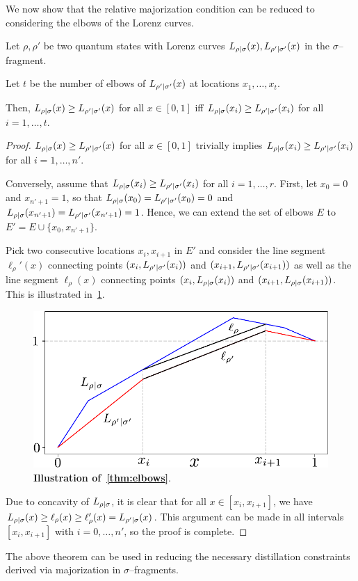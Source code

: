 \documentclass[pra,
aps,
twocolumn,
superscriptaddress,
groupedaddress,
nofootinbib,
reprint
]{revtex4-1}
\begin{document}
We now show that the relative majorization condition can be reduced to considering the elbows of the Lorenz curves.
\begin{proposition}\label{thm:elbows}
	Let $\rho, \rho'$ be two quantum states with Lorenz curves ${L_{\rho|\sigma}}(x), {L_{\rho'|\sigma'}}(x)$ in the $\sigma$--fragment.
	
	Let $t$ be the number of elbows of ${L_{\rho'|\sigma'}}(x)$ at locations $x_1, \dots, x_t$.
	
	Then, ${L_{\rho|\sigma}}(x) \geq {L_{\rho'|\sigma'}}(x)$ for all $x \in [0,1]$ iff ${L_{\rho|\sigma}}(x_{i}) \geq {L_{\rho'|\sigma'}}(x_{i})$ for all $i =1,\dots,t$.
\end{proposition}
\begin{proof}	
	${L_{\rho|\sigma}}(x) \geq {L_{\rho'|\sigma'}}(x)$ for all $x \in [0,1]$ trivially implies ${L_{\rho|\sigma}}(x_{i}) \geq {L_{\rho'|\sigma'}}(x_{i})$ for all $i = 1,\dots,n'$.
	
	Conversely, assume that ${L_{\rho|\sigma}}(x_{i}) \geq {L_{\rho'|\sigma'}}(x_{i})$ for all $i = 1,\dots,r$.
	First, let $x_0 = 0$ and $x_{n'+1} = 1$, so that ${L_{\rho|\sigma}}(x_0) = {L_{\rho'|\sigma'}}(x_0) = 0$ and ${L_{\rho|\sigma}}(x_{n'+1}) = {L_{\rho'|\sigma'}}(x_{n'+1}) = 1$.
	Hence, we can extend the set of elbows $E$ to $E' = E \cup \{x_0, x_{n'+1}\}$.
	
	Pick two consecutive locations $x_{i}, x_{i+1}$ in $E'$ and consider the line segment $\ell_\rho'(x)$ connecting points $(x_{i}, {L_{\rho'|\sigma'}}(x_{i}))$ and $(x_{i+1}, {L_{\rho'|\sigma'}}(x_{i+1}))$ as well as the line segment $\ell_\rho(x)$ connecting points $(x_{i}, {L_{\rho|\sigma}}(x_{i}))$ and $(x_{i+1}, {L_{\rho|\sigma}}(x_{i+1}))$.
	This is illustrated in~\cref{fig:elbows_proof}.
\begin{figure}[h]
    \centering
    \includegraphics[scale=0.5]{figs/elbows_proof.pdf}
    \caption{\textbf{Illustration of~\cref{thm:elbows}}.
    }
    \label{fig:elbows_proof}
\end{figure}

	Due to concavity of ${L_{\rho|\sigma}}$, it is clear that for all $x \in [x_{i}, x_{i+1}]$, we have ${L_{\rho|\sigma}}(x) \geq \ell_\rho(x) \geq \ell_\rho'(x) = {L_{\rho'|\sigma}}(x)$.
	This argument can be made in all intervals $[x_{i}, x_{i+1}]$ with $i=0,\dots,n'$, so the proof is complete.
\end{proof}
The above theorem can be used in reducing the necessary distillation constraints derived via majorization in $\sigma$--fragments.
\end{document}
